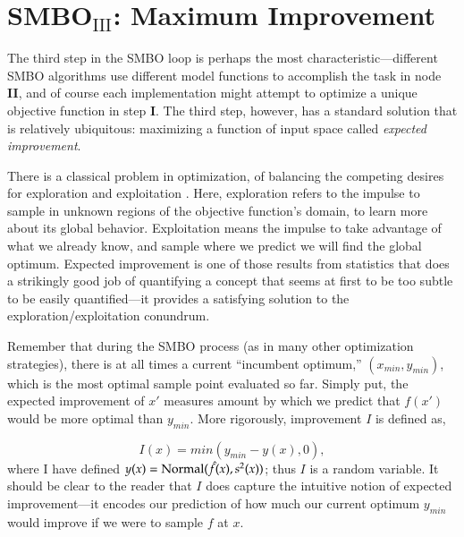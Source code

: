 
\section{SMBO$_{\text{III}}$: Maximum Improvement}\label{sec:max_imp}

The third step in the SMBO loop is perhaps the most characteristic---different SMBO algorithms use different model functions to accomplish the task in node \textbf{II}, and of course each implementation might attempt to optimize a unique objective function in step \textbf{I}. The third step, however, has a standard solution that is relatively ubiquitous: maximizing a function of input space called \emph{expected improvement}. 

There is a classical problem in optimization, of balancing the competing desires for exploration and exploitation \cite{john_holland}. Here, exploration refers to the impulse to sample in unknown regions of the objective function's domain, to learn more about its global behavior. Exploitation means the impulse to take advantage of what we already know, and sample where we predict we will find the global optimum. Expected improvement is one of those results from statistics that does a strikingly good job of quantifying a concept that seems at first to be too subtle to be easily quantified---it provides a satisfying solution to the exploration/exploitation conundrum.

Remember that during the SMBO process (as in many other optimization strategies), there is at all times a current ``incumbent optimum,'' $(x_{min},y_{min})$, which is the most optimal sample point evaluated so far. Simply put, the expected improvement of $x'$ measures amount by which we predict that $f(x')$ would be more optimal than $y_{min}$. More rigorously, improvement $I$ is defined as,

\begin{equation} \label{eq:improvement}
I(x) = min(y_{min}-y(x),0),
\end{equation}
where I have defined $y(x)=\text{Normal}(\hat{f}(x),s^2(x))$; thus $I$ is a random variable. It should be clear to the reader that $I$ does capture the intuitive notion of expected improvement---it encodes our prediction of how much our current optimum $y_{min}$ would improve if we were to sample $f$ at $x$.

